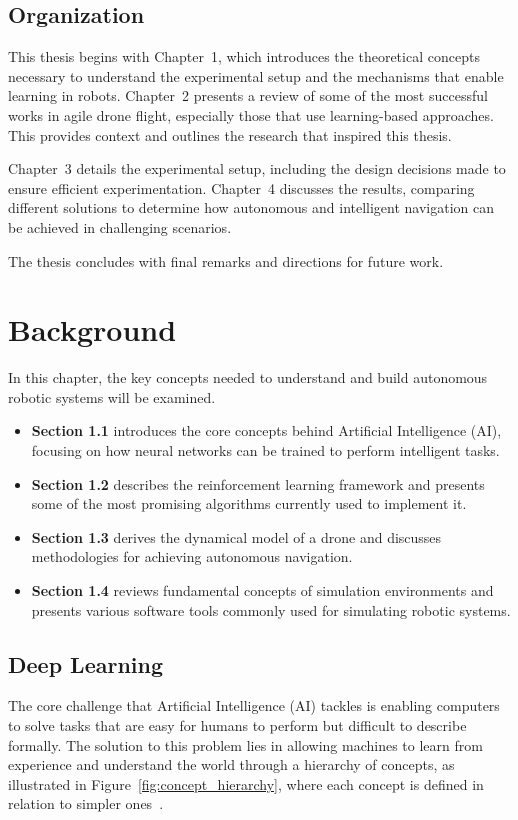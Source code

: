 \documentclass[a4paper,oneside]{book}
\theoremstyle{definition}
\begin{document}
\section*{Organization}

This thesis begins with Chapter~1, which introduces the theoretical concepts necessary to understand the experimental setup and the mechanisms that enable learning in robots. Chapter~2 presents a review of some of the most successful works in agile drone flight, especially those that use learning-based approaches. This provides context and outlines the research that inspired this thesis.

Chapter~3 details the experimental setup, including the design decisions made to ensure efficient experimentation. Chapter~4 discusses the results, comparing different solutions to determine how autonomous and intelligent navigation can be achieved in challenging scenarios.

The thesis concludes with final remarks and directions for future work.

\newpage

\chapter{Background}
In this chapter, the key concepts needed to understand and build autonomous robotic systems will be examined.

\begin{itemize}
    \item \textbf{Section 1.1} introduces the core concepts behind Artificial Intelligence (AI), focusing on how neural networks can be trained to perform intelligent tasks.
    
    \item \textbf{Section 1.2} describes the reinforcement learning framework and presents some of the most promising algorithms currently used to implement it.
    
    \item \textbf{Section 1.3} derives the dynamical model of a drone and discusses methodologies for achieving autonomous navigation.
    
    \item \textbf{Section 1.4} reviews fundamental concepts of simulation environments and presents various software tools commonly used for simulating robotic systems.
\end{itemize}
\section{Deep Learning}
The core challenge that Artificial Intelligence (AI) tackles is enabling computers to solve tasks that are easy for humans to perform but difficult to describe formally. The solution to this problem lies in allowing machines to learn from experience and understand the world through a hierarchy of concepts, as illustrated in Figure~\ref{fig:concept_hierarchy}, where each concept is defined in relation to simpler ones~\cite{ref10}.
\end{document}
